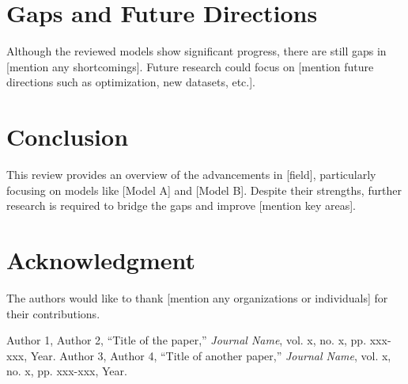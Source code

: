 \documentclass[journal]{IEEEtran}
\begin{document}
\section{Gaps and Future Directions}
Although the reviewed models show significant progress, there are still gaps in [mention any shortcomings]. Future research could focus on [mention future directions such as optimization, new datasets, etc.].

\section{Conclusion}
This review provides an overview of the advancements in [field], particularly focusing on models like [Model A] and [Model B]. Despite their strengths, further research is required to bridge the gaps and improve [mention key areas].

\section*{Acknowledgment}
The authors would like to thank [mention any organizations or individuals] for their contributions.

\begin{thebibliography}{00}
 Author 1, Author 2, ``Title of the paper,'' \textit{Journal Name}, vol. x, no. x, pp. xxx-xxx, Year.
 Author 3, Author 4, ``Title of another paper,'' \textit{Journal Name}, vol. x, no. x, pp. xxx-xxx, Year.
\end{thebibliography}
\end{document}
